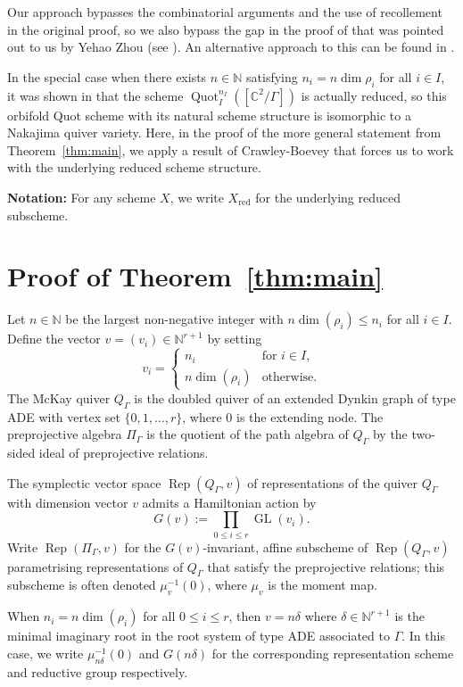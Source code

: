 \documentclass[11pt,reqno]{amsart}
\numberwithin{equation}{section}
\theoremstyle{definition}
\newcommand{\GL}{\operatorname{GL}}
\newcommand{\Quot}{\operatorname{Quot}}
\newcommand{\Rep}{\operatorname{Rep}}
\newcommand{\QuotI}[1][ ]{\Quot_I^{#1}}
\newcommand{\QuotInI}{\QuotI[n_I]}
\begin{document}
Our approach bypasses the combinatorial arguments and the use of recollement in the original proof, so we also bypass the gap in the proof of \cite[Proposition~6.1]{CGGS2} that was pointed out to us by Yehao Zhou (see \cite[Remarks~6.8(2)]{CY23}). An alternative approach to this can be found in \cite{Bertsch24}. 

In the special case when there exists $n\in \mathbb{N}$ satisfying $n_i=n\dim \rho_i$ for all $i\in I$, it was shown in \cite[Corollary~6.7]{CY23} that the scheme $\QuotInI ([\mathbb{C}^2/\Gamma])$ is actually reduced, so this orbifold Quot scheme with its natural scheme structure is isomorphic to a Nakajima quiver variety. Here, in the proof of the more general statement from Theorem~\ref{thm:main}, we apply a result of Crawley-Boevey that forces us to work with the underlying reduced scheme structure. 

\smallskip

\noindent \textbf{Notation:} For any scheme $X$, we write $X_{\textrm{red}}$ for the underlying reduced subscheme.

 \section{Proof of Theorem~\ref{thm:main}}
 Let $n\in \mathbb{N}$ be the largest non-negative integer with $n\dim(\rho_i) \leq n_i$ for all $i\in I$. Define the vector $v=(v_i)\in \mathbb{N}^{r+1}$ by setting 
 \[
 v_i=\left\{
 \begin{array}{cr} 
 n_i & \text{for }i\in I, \\
 n\dim(\rho_i) & \text{otherwise.}
 \end{array}\right.
 \]
 The McKay quiver $Q_\Gamma$ is the doubled quiver of an extended Dynkin graph of type ADE with vertex set $\{0,1,\dots, r\}$, where $0$ is the extending node. The preprojective algebra $\Pi_\Gamma$ is the quotient of the path algebra of $Q_\Gamma$ by the two-sided ideal of preprojective relations. 
 
 The symplectic vector space $\Rep(Q_\Gamma,v)$ of representations of the quiver $Q_\Gamma$ with dimension vector $v$ admits a Hamiltonian action by  \[
 G(v):=\prod_{0\leq i\leq r} \GL(v_i).
 \]
 Write $\Rep(\Pi_\Gamma,v)$ for the $G(v)$-invariant, affine subscheme of $\Rep(Q_\Gamma,v)$ parametrising  representations of $Q_\Gamma$ that satisfy the preprojective relations; this subscheme is often denoted $\mu_v^{-1}(0)$, where $\mu_v$ is the moment map. 
 
 When $n_i=n\dim(\rho_i)$ for all $0\leq i\leq r$,  then $v=n\delta$ where $\delta\in\mathbb{N}^{r+1}$ is the minimal imaginary root in the root system of type ADE associated to $\Gamma$. In this case, we write $\mu_{n\delta}^{-1}(0)$ and $G(n\delta)$ for the corresponding representation scheme and reductive group respectively.
 
\end{document}
